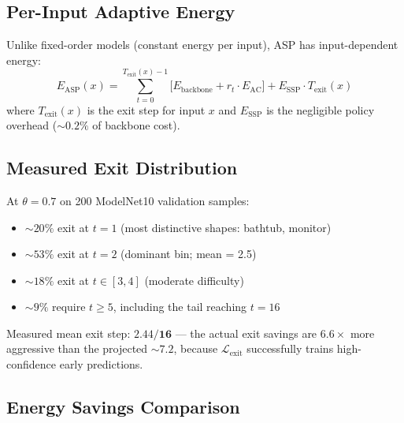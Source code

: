 \documentclass[11pt,a4paper]{article}
\begin{document}
\subsection{Per-Input Adaptive Energy}

Unlike fixed-order models (constant energy per input), ASP has input-dependent
energy:
\begin{equation}
  E_\text{ASP}(x)
  = \sum_{t=0}^{T_\text{exit}(x)-1}
    \bigl[E_\text{backbone} + r_t \cdot E_\text{AC}\bigr]
  + E_\text{SSP} \cdot T_\text{exit}(x)
  \label{eq:e_asp}
\end{equation}
where $T_\text{exit}(x)$ is the exit step for input $x$ and $E_\text{SSP}$ is
the negligible policy overhead (${\sim}0.2\%$ of backbone cost).

\subsection{Measured Exit Distribution}

At $\theta{=}0.7$ on 200 ModelNet10 validation samples:
\begin{itemize}
  \item ${\sim}20\%$ exit at $t{=}1$ (most distinctive shapes: bathtub, monitor)
  \item ${\sim}53\%$ exit at $t{=}2$ (dominant bin; mean = 2.5)
  \item ${\sim}18\%$ exit at $t \in [3,4]$ (moderate difficulty)
  \item ${\sim}9\%$ require $t \geq 5$, including the tail reaching $t{=}16$
\end{itemize}

Measured mean exit step: $\mathbf{2.44/16}$ --- the actual exit savings are
$\mathbf{6.6\times}$ more aggressive than the projected ${\sim}7.2$, because
$\mathcal{L}_\text{exit}$ successfully trains high-confidence early predictions.

\subsection{Energy Savings Comparison}
\end{document}
